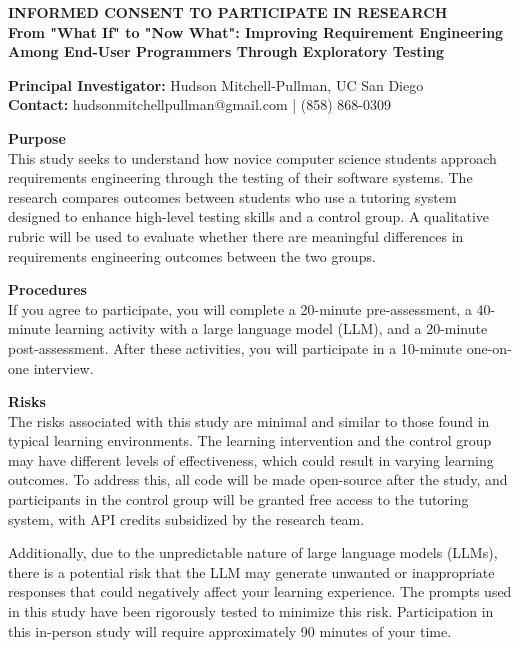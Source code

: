 \documentclass[11pt]{article}
\begin{document}
\begin{center}
\textbf{\large INFORMED CONSENT TO PARTICIPATE IN RESEARCH}\\[0.5em]
\textbf{From "What If" to "Now What": Improving Requirement Engineering Among End-User Programmers Through Exploratory Testing}
\end{center}

\noindent\textbf{Principal Investigator:} Hudson Mitchell-Pullman, UC San Diego\\
\textbf{Contact:} hudsonmitchellpullman@gmail.com | (858) 868-0309

\vspace{1em}

\noindent\textbf{Purpose}\\
This study seeks to understand how novice computer science students approach requirements engineering through the testing of their software systems. The research compares outcomes between students who use a tutoring system designed to enhance high-level testing skills and a control group. A qualitative rubric will be used to evaluate whether there are meaningful differences in requirements engineering outcomes between the two groups.

\vspace{0.8em}

\noindent\textbf{Procedures}\\
If you agree to participate, you will complete a 20-minute pre-assessment, a 40-minute learning activity with a large language model (LLM), and a 20-minute post-assessment. After these activities, you will participate in a 10-minute one-on-one interview.

\vspace{0.8em}

\noindent\textbf{Risks}\\
The risks associated with this study are minimal and similar to those found in typical learning environments. The learning intervention and the control group may have different levels of effectiveness, which could result in varying learning outcomes. To address this, all code will be made open-source after the study, and participants in the control group will be granted free access to the tutoring system, with API credits subsidized by the research team.

Additionally, due to the unpredictable nature of large language models (LLMs), there is a potential risk that the LLM may generate unwanted or inappropriate responses that could negatively affect your learning experience. The prompts used in this study have been rigorously tested to minimize this risk. Participation in this in-person study will require approximately 90 minutes of your time.
\end{document}

